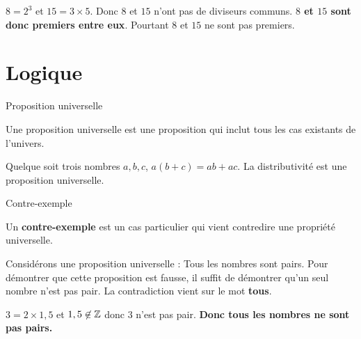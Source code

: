 \begin{pageCours}
\begin{minipage}{0.5\linewidth}
\begin{Att}
$8=2^3$ et $15=3 \times 5$.
Donc $8$ et $15$ n'ont pas de diviseurs communs. \textbf{$8$ et $15$ sont donc premiers entre eux}. Pourtant $8$ et $15$ ne sont pas premiers.
  
\end{Att}
\end{minipage}




\section{Logique}

\begin{minipage}{0.5\linewidth}
\begin{DefT}{Proposition universelle}

Une proposition universelle est une proposition qui inclut tous les cas existants de l'univers. 

\end{DefT}
\end{minipage}
\begin{minipage}{0.5\linewidth}
\begin{Ex} 

Quelque soit trois nombres $a, b, c$, $a(b+c)=ab+ac$. La distributivité est une proposition universelle.

\end{Ex}
\end{minipage}

\begin{minipage}{0.5\linewidth}
\begin{DefT}{Contre-exemple}

Un \textbf{contre-exemple} est un cas particulier qui vient contredire une propriété universelle. 

\end{DefT}

\end{minipage}
\begin{minipage}{0.5\linewidth}

\begin{Ex} 

Considérons une proposition universelle : Tous les nombres sont pairs. Pour démontrer que cette proposition est fausse, il suffit de démontrer qu'un seul nombre n'est pas pair. La contradiction vient sur le mot \textbf{tous}.

$3=2\times1,5$ et $1,5 \not\in\mathbb Z$ donc $3$ n'est pas pair. \textbf{Donc tous les nombres ne sont pas pairs.}

\end{Ex}
\end{minipage}




\end{pageCours} 
